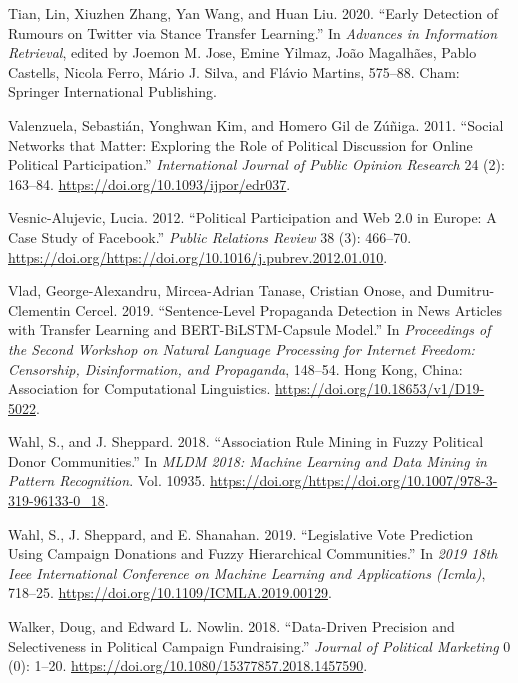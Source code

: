 \documentclass[12pt,]{article}
\begin{document}
\leavevmode\hypertarget{ref-tian2020}{}%
Tian, Lin, Xiuzhen Zhang, Yan Wang, and Huan Liu. 2020. ``Early
Detection of Rumours on Twitter via Stance Transfer Learning.'' In
\emph{Advances in Information Retrieval}, edited by Joemon M. Jose,
Emine Yilmaz, João Magalhães, Pablo Castells, Nicola Ferro, Mário J.
Silva, and Flávio Martins, 575--88. Cham: Springer International
Publishing.

\leavevmode\hypertarget{ref-valenzuela2011}{}%
Valenzuela, Sebastián, Yonghwan Kim, and Homero Gil de Zúñiga. 2011.
``Social Networks that Matter: Exploring the Role of Political
Discussion for Online Political Participation.'' \emph{International
Journal of Public Opinion Research} 24 (2): 163--84.
\url{https://doi.org/10.1093/ijpor/edr037}.

\leavevmode\hypertarget{ref-vesnic2012}{}%
Vesnic-Alujevic, Lucia. 2012. ``Political Participation and Web 2.0 in
Europe: A Case Study of Facebook.'' \emph{Public Relations Review} 38
(3): 466--70.
\url{https://doi.org/https://doi.org/10.1016/j.pubrev.2012.01.010}.

\leavevmode\hypertarget{ref-vlad2019}{}%
Vlad, George-Alexandru, Mircea-Adrian Tanase, Cristian Onose, and
Dumitru-Clementin Cercel. 2019. ``Sentence-Level Propaganda Detection in
News Articles with Transfer Learning and BERT-BiLSTM-Capsule Model.'' In
\emph{Proceedings of the Second Workshop on Natural Language Processing
for Internet Freedom: Censorship, Disinformation, and Propaganda},
148--54. Hong Kong, China: Association for Computational Linguistics.
\url{https://doi.org/10.18653/v1/D19-5022}.

\leavevmode\hypertarget{ref-wahl2018}{}%
Wahl, S., and J. Sheppard. 2018. ``Association Rule Mining in Fuzzy
Political Donor Communities.'' In \emph{MLDM 2018: Machine Learning and
Data Mining in Pattern Recognition}. Vol. 10935.
\url{https://doi.org/https://doi.org/10.1007/978-3-319-96133-0_18}.

\leavevmode\hypertarget{ref-wahl2019}{}%
Wahl, S., J. Sheppard, and E. Shanahan. 2019. ``Legislative Vote
Prediction Using Campaign Donations and Fuzzy Hierarchical
Communities.'' In \emph{2019 18th Ieee International Conference on
Machine Learning and Applications (Icmla)}, 718--25.
\url{https://doi.org/10.1109/ICMLA.2019.00129}.

\leavevmode\hypertarget{ref-walker2018}{}%
Walker, Doug, and Edward L. Nowlin. 2018. ``Data-Driven Precision and
Selectiveness in Political Campaign Fundraising.'' \emph{Journal of
Political Marketing} 0 (0): 1--20.
\url{https://doi.org/10.1080/15377857.2018.1457590}.
\end{document}
